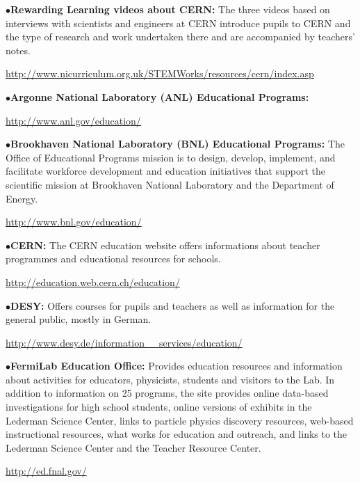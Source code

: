 \medskip

\item{$\bullet$}{\bf Rewarding Learning videos about CERN:}
The three videos based on interviews with scientists and engineers at CERN introduce pupils to CERN and the type of research and work undertaken there and are accompanied by teachers' notes.
	\item{}\qquad\url{http://www.nicurriculum.org.uk/STEMWorks/resources/cern/index.asp}


\medskip
\medskip


\smallskip

\item{$\bullet$}{\bf Argonne National Laboratory (ANL) Educational Programs:}
	\item{}\qquad\url{http://www.anl.gov/education/}

\smallskip

\item{$\bullet$}{\bf Brookhaven National Laboratory (BNL) Educational Programs:}
The Office of Educational Programs mission is to design, develop, implement, and facilitate workforce development and education initiatives that support the scientific mission at Brookhaven National Laboratory and the Department of Energy.
	\item{}\qquad\url{http://www.bnl.gov/education/}

\smallskip

\item{$\bullet$}{\bf CERN:} 
The CERN education website offers informations about teacher programmes and educational resources for schools.
	\item{}\qquad\url{http://education.web.cern.ch/education/}

\smallskip

\item{$\bullet$}{\bf DESY:}
Offers courses for pupils and teachers as well as information for the general public, mostly in German.
	\item{}\qquad\url{http://www.desy.de/information\_\_services/education/}

\smallskip

\item{$\bullet$}{\bf FermiLab Education Office:} 
Provides  education resources and information about activities for educators, physicists, students and visitors to the Lab. In addition to information on 25 programs, the site  provides online data-based investigations for high school students, online versions of exhibits in the Lederman Science Center, links to particle physics discovery resources, web-based instructional resources, what works for education and outreach, and links to the Lederman Science Center and the Teacher Resource Center.
	\item{}\qquad\url{http://ed.fnal.gov/}

